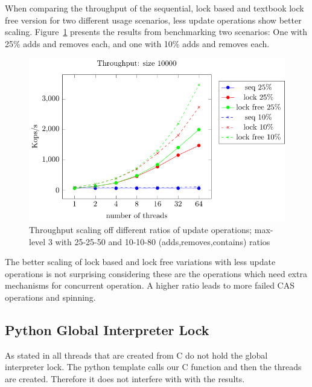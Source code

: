 \documentclass{article}
\begin{document}
When comparing the throughput of the sequential, lock based and textbook lock free version for two different usage scenarios, less update operations show better scaling.
Figure~\ref{fig:throughput_percent} presents the results from benchmarking two scenarios: One with 25\% adds and removes each, and one with 10\% adds and removes each.
\begin{figure}[H]
  \centering
  \includegraphics{plots_for_report/throughput_percent_plot.pdf}
  \caption{Throughput scaling off different ratios of update operations; max-level 3 with 25-25-50 and 10-10-80 (adds,removes,contains) ratios}
  \label{fig:throughput_percent}
\end{figure}
The better scaling of lock based and lock free variations with less update operations is not surprising considering these are the operations which need extra mechanisms for concurrent operation.
A higher ratio leads to more failed CAS operations and spinning.


\subsection{Python Global Interpreter Lock}
As stated in \cite{python_lock} all threads that are created from C do not hold the global interpreter lock. The python template calls our C function and then the threads are created. Therefore it does not interfere with with the results.
\end{document}
